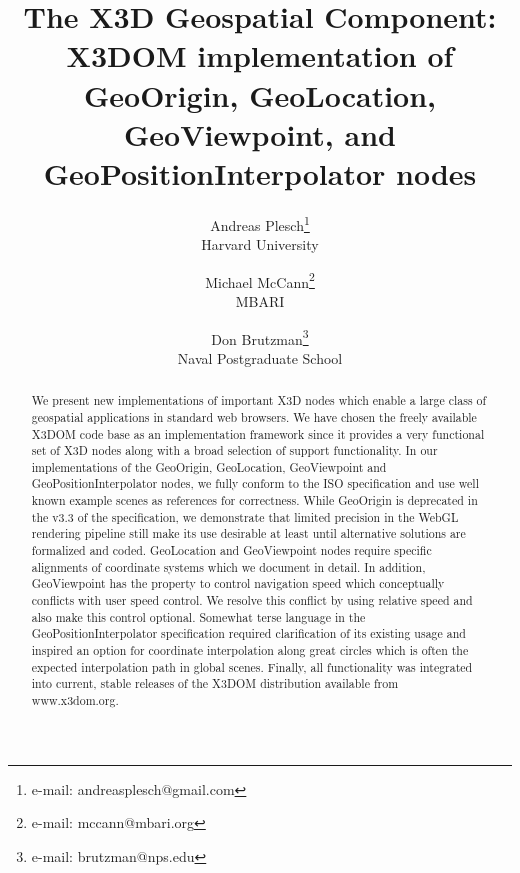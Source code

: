 \documentclass{acmsiggraph}                     %
\title{The X3D Geospatial Component: X3DOM implementation of GeoOrigin, GeoLocation, GeoViewpoint,
and GeoPositionInterpolator nodes}
\author{Andreas Plesch\thanks{e-mail: andreasplesch@gmail.com}\\Harvard University \and Michael
McCann\thanks{e-mail: mccann@mbari.org}\\MBARI \and Don Brutzman\thanks{e-mail:
brutzman@nps.edu}\\Naval Postgraduate School}
\begin{document}



\maketitle


\begin{abstract}

We present new implementations of important X3D nodes which enable a large class of geospatial
applications in standard web browsers. We have chosen the freely available X3DOM code base as an
implementation framework since it provides a very functional set of X3D nodes along with a broad
selection of support functionality. In our implementations of the GeoOrigin, GeoLocation,
GeoViewpoint and GeoPositionInterpolator nodes, we fully conform to the ISO specification and use
well known example scenes as references for correctness. While GeoOrigin is deprecated in the v3.3
of the specification, we demonstrate that limited precision in the WebGL rendering pipeline still
make its use desirable at least until alternative solutions are formalized and coded. GeoLocation
and GeoViewpoint nodes require specific alignments of coordinate systems which we document in
detail. In addition, GeoViewpoint has the property to control navigation speed which conceptually
conflicts with user speed control. We resolve this conflict by using relative speed and also make
this control optional. Somewhat terse language in the GeoPositionInterpolator specification required
clarification of its existing usage and inspired an option for coordinate interpolation along great
circles which is often the expected interpolation path in global scenes. Finally, all functionality
was integrated into current, stable releases of the X3DOM distribution available from www.x3dom.org.

\end{abstract}
\end{document}
